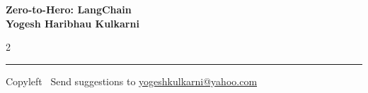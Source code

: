 \documentclass[8pt,landscape]{article}
\begin{document}
\footnotesize


\begin{center}
\Large{\textbf{Zero-to-Hero: LangChain\\ Yogesh Haribhau Kulkarni}}
\end{center}

\begin{multicols}{2}

\end{multicols}

\rule{\linewidth}{0.25pt}
\scriptsize
Copyleft \textcopyleft\  Send suggestions to
\href{http://www.yogeshkulkarni.com}{yogeshkulkarni@yahoo.com}
\end{document}
